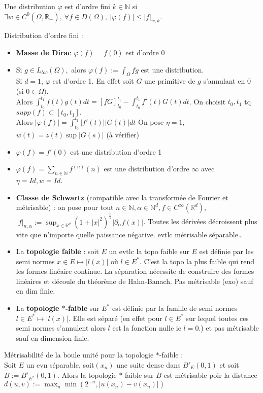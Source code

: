 Une distribution $\varphi $ est d'ordre fini $k\in \mathbb{N} $ si $\exists w\in C^0(\Omega,\mathbb{R} _+),\ \forall f\in D(\Omega),\ |\varphi (f)|\le |f|_{w,k} $.
\begin{ex}
    Distribution d'ordre fini :
    \begin{itemize}
        \item \textbf{Masse de Dirac} $\varphi (f)=f(0)$ est d'ordre 0
        \item Si $g\in L_{loc}(\Omega),$ alors $\varphi (f):=\int_\Omega fg$ est une distribution. \\
            Si $d=1$, $\varphi $ est d'ordre 1. En effet soit $G$ une primitive de $g$ s'annulant en 0 (si 0$\in \Omega)$. \\Alors $\int_{t_0}^{t_1}f(t)g(t)dt=[fG]_{t_0}^{t_1}-\int_{t_0}^{t_1}f'(t)G(t)dt$. On choisit $t_0,t_1$ tq $supp(f)\subset [t_0,t_1].$ \\Alors $|\varphi (f)|=\int_{t_0}^{t_1}|f'(t)| |G(t)|dt$ On pose $\eta=1 $, $w(t)=z(t)\sup|G(s)|$ (à vérifier)
        \item $\varphi (f)=f'(0)$ est une distribution d'ordre 1
        \item $\varphi (f)=\sum\limits_{n\in \mathbb{N} }^{} f^{(n)}(n)$ est une distribution d'ordre $\infty $ avec $\eta=Id, w=Id$.
        \item  \textbf{Classe de Schwartz} (compatible avec la transformée de Fourier et métrisable) : on pose pour tout $n\in \mathbb{N} , \alpha \in \mathbb{N} ^d,f\in C^\infty (\mathbb{R} ^d)$, $|f|_{n, \alpha }:=\sup_{x\in \mathbb{R} ^d}(1+|x|^2)^{\frac{n}{2}}|\partial_\alpha f(x)|$. Toutes les dérivées décroissent plus vite que n'importe quelle paissance négative. evtlc métrisable séparable\ldots
        \item La \textbf{topologie faible} : soit $E$ un evtlc la topo faible sur $E$ est définie par les semi normes $x\in E\mapsto |l(x)|$ où $l\in E^*$. C'est la topo la plus faible qui rend les formes linéaire continue. La séparation nécessite de construire des formes linéaires et découle du théorème de Hahn-Banach. Pas métrisable (exo) sauf en dim finie.
        \item La \textbf{topologie $*$-faible} sur $E^*$ est définie par la famille de semi normes $l\in E^*\mapsto |l(x)|$. Elle est séparé (en effet pour $l\in E^*$ sur lequel toutes ces semi normes s'annulent alors $l$ est la fonction nulle ie $l=0$.) et pas métrisable sauf en dimension finie.
    \end{itemize}
\end{ex}
\begin{proposition}
    Métrisabilité de la boule unité pour la topologie $*$-faible :\\
    Soit $E$ un evn séparable, soit$(x_{n})$ une suite dense dans $B'_E(0,1)$ et soit $B:=B'_{E^*}(0,1)$. Alors la topologie $*$-faible sur $B$ est métrisable poir la distance $d(u,v):=\max_n\min(2^{-n}, |u(x_{n})-v(x_{n})|)$
\end{proposition}

